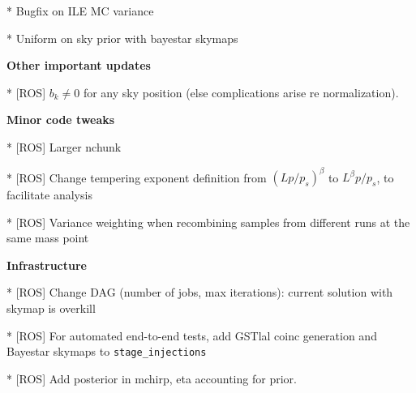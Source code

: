 \documentclass[twocolumn,prd,nofootinbib]{revtex4}
\newcommand\BS{{\sc Bayestar}}
\newcommand\gstlal{{\sc GSTlal}}
\begin{document}
{* Bugfix on ILE MC variance

* Uniform on sky prior with bayestar skymaps

\noindent \textbf{Other important updates}

*  [ROS]  $b_k \ne 0$ for any sky position (else complications arise re normalization).


\noindent \textbf{Minor code tweaks}

* [ROS] Larger nchunk

* [ROS] Change tempering exponent definition from $(Lp/p_s)^\beta$ to $L^\beta p/p_s$, to facilitate analysis

* [ROS] Variance weighting when recombining samples from different runs at the same mass point


\noindent \textbf{Infrastructure}

* [ROS] Change DAG (number of jobs, max iterations): current solution with skymap is overkill


* [ROS] For automated end-to-end tests, add \gstlal{} coinc generation and \BS{} skymaps to \texttt{stage\_injections}

* [ROS] Add posterior in mchirp, eta accounting for prior.
}

\end{document}
